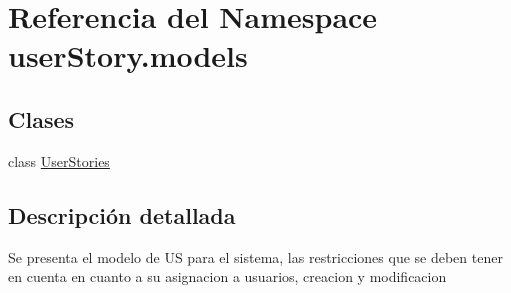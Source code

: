 \hypertarget{namespaceuser_story_1_1models}{}\section{Referencia del Namespace user\+Story.\+models}
\label{namespaceuser_story_1_1models}
\subsection*{Clases}
\begin{DoxyCompactItemize}
\item 
class \hyperlink{classuser_story_1_1models_1_1_user_stories}{User\+Stories}
\end{DoxyCompactItemize}


\subsection{Descripción detallada}
\begin{DoxyVerb}Se presenta el modelo de US para el sistema, las restricciones
que se deben tener en cuenta en cuanto a su asignacion a usuarios,
creacion y modificacion\end{DoxyVerb}
 